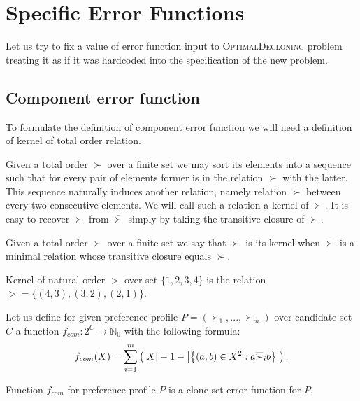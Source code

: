 \section{Specific Error Functions}

Let us try to fix a value of error function input to \textsc{OptimalDecloning} problem
treating it as if it was hardcoded into the specification of the new problem.


\subsection{Component error function}


To formulate the definition of component error function we will need a definition of kernel of total order relation.

Given a total order $\succ$ over a finite set we may sort its elements into a sequence
such that for every pair of elements former is in the relation $\succ$ with the latter.
This sequence naturally induces another relation, namely relation $\overline{\succ}$
between every two consecutive elements.
We will call such a relation a kernel of $\overline{\succ}$.
It is easy to recover $\succ$ from $\overline{\succ}$ simply by taking the transitive closure of $\succ$.

\begin{defn}
Given a total order $\succ$ over a finite set we say that $\overline{\succ}$ is its kernel when
$\overline{\succ}$ is a minimal relation whose transitive closure equals $\succ$.
\end{defn}

\begin{exmp}
Kernel of natural order $>$ over set $\{1,2,3,4\}$ is the relation
$\overline{>} = \{(4,3), (3,2), (2,1)\}$.
\end{exmp}

\begin{defn}
Let us define for given preference profile $P = (\succ_1, ..., \succ_m)$ over candidate set $C$
a function $f_{com}: 2^C \rightarrow \mathbb{N}_0$ with the following formula:
$$ f_{com}(X) = \sum_{i=1}^m \left( \left\vert X \right\vert-1 -
\left\vert \left\lbrace \left( a,b \right) \in X^2 : a \overline{\succ}_i b \right\rbrace  \right\vert
\right) \text{.}$$
\end{defn}

\begin{rmrk}
Function $f_{com}$ for preference profile $P$ is a clone set error function for $P$.
\end{rmrk}

